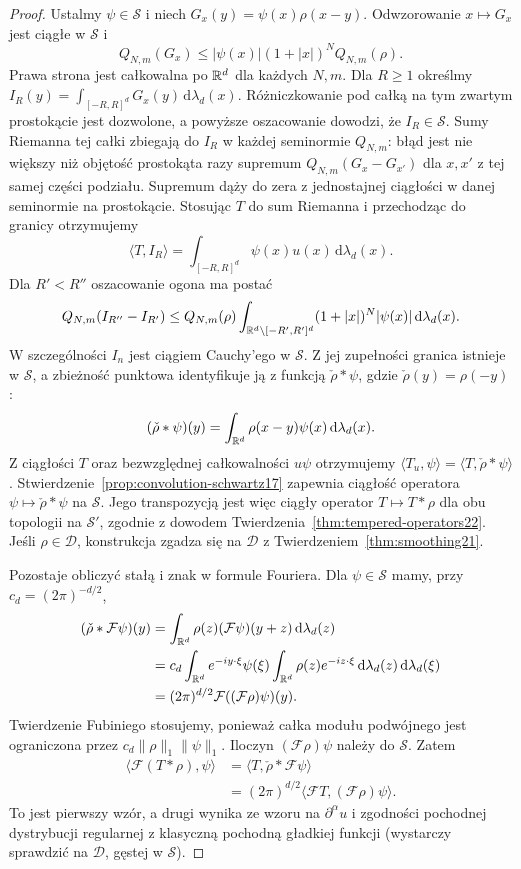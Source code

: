 \begin{proof}
Ustalmy $\psi\in\mathcal S$ i niech $G_x(y)=
\psi(x)\rho(x-y)$. Odwzorowanie $x\mapsto G_x$
jest ciągłe w $\mathcal S$ i
\[
 Q_{N,m}(G_x)\le |\psi(x)|(1+|x|)^N Q_{N,m}(\rho).
\]
Prawa strona jest całkowalna po $\mathbb R^d$ dla każdych $N,m$.
Dla $R\ge1$ określmy $I_R(y)=\int_{[-R,R]^d}G_x(y)
\,\mathrm d\lambda_d(x)$. Różniczkowanie pod całką na
tym zwartym prostokącie jest dozwolone, a powyższe
oszacowanie dowodzi, że $I_R\in\mathcal S$.
Sumy Riemanna tej całki zbiegają do $I_R$ w każdej
seminormie $Q_{N,m}$: błąd jest nie większy niż
objętość prostokąta razy supremum
$Q_{N,m}(G_x-G_{x'})$ dla $x,x'$ z tej samej części
podziału. Supremum dąży do zera z jednostajnej
ciągłości w danej seminormie na prostokącie.
Stosując $T$ do sum Riemanna i przechodząc do granicy
otrzymujemy
\[
 \langle T,I_R\rangle=
 \int_{[-R,R]^d}\psi(x)u(x)\,\mathrm d\lambda_d(x).
\]
Dla $R'<R''$ oszacowanie ogona ma postać
\[
 Q_{N,m}(I_{R''}-I_{R'})
 \le Q_{N,m}(\rho)
 \int_{\mathbb R^d\setminus[-R',R']^d}
 (1+|x|)^N|\psi(x)|\,\mathrm d\lambda_d(x).
\]
W szczególności $I_n$ jest ciągiem Cauchy'ego w $\mathcal S$.
Z jej zupełności granica istnieje w $\mathcal S$, a
zbieżność punktowa identyfikuje ją z funkcją
$\check\rho*\psi$, gdzie $\check\rho(y)=\rho(-y)$:
\[
 (\check\rho*\psi)(y)=
 \int_{\mathbb R^d}\rho(x-y)\psi(x)\,\mathrm d\lambda_d(x).
\]
Z ciągłości $T$ oraz bezwzględnej całkowalności
$u\psi$ otrzymujemy
$\langle T_u,\psi\rangle=\langle T,\check\rho*\psi\rangle$.
Stwierdzenie~\ref{prop:convolution-schwartz17} zapewnia
ciągłość operatora $\psi\mapsto\check\rho*\psi$ na
$\mathcal S$. Jego transpozycją jest więc ciągły
operator $T\mapsto T*\rho$ dla obu topologii na
$\mathcal S'$, zgodnie z dowodem
Twierdzenia~\ref{thm:tempered-operators22}.
Jeśli $\rho\in\mathcal D$, konstrukcja zgadza się na
$\mathcal D$ z Twierdzeniem~\ref{thm:smoothing21}.

Pozostaje obliczyć stałą i znak w formule Fouriera.
Dla $\psi\in\mathcal S$ mamy, przy $c_d=(2\pi)^{-d/2}$,
\[
\begin{aligned}
(\check\rho*\mathcal F\psi)(y)
 &=\int_{\mathbb R^d}\rho(z)(\mathcal F\psi)(y+z)
 \,\mathrm d\lambda_d(z)\\
 &=c_d\int_{\mathbb R^d}e^{-iy\cdot\xi}\psi(\xi)
 \int_{\mathbb R^d}\rho(z)e^{-iz\cdot\xi}\,\mathrm d\lambda_d(z)
 \,\mathrm d\lambda_d(\xi)\\
 &=(2\pi)^{d/2}\mathcal F((\mathcal F\rho)\psi)(y).
\end{aligned}
\]
Twierdzenie Fubiniego stosujemy, ponieważ całka
modułu podwójnego jest ograniczona przez
$c_d\|\rho\|_1\|\psi\|_1$. Iloczyn
$(\mathcal F\rho)\psi$ należy do $\mathcal S$.
Zatem
\[
\begin{aligned}
\langle\mathcal F(T*\rho),\psi\rangle
&=\langle T,\check\rho*\mathcal F\psi\rangle\\
&=(2\pi)^{d/2}\langle\mathcal FT,
 (\mathcal F\rho)\psi\rangle.
\end{aligned}
\]
To jest pierwszy wzór, a drugi wynika ze wzoru na
$\partial^\alpha u$ i zgodności pochodnej dystrybucji
regularnej z klasyczną pochodną gładkiej funkcji
(wystarczy sprawdzić na $\mathcal D$, gęstej w $\mathcal S$).
\end{proof}

